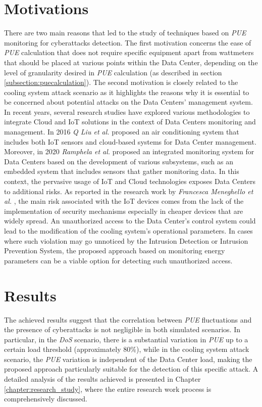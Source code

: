 \section{Motivations}
There are two main reasons that led to the study of techniques based on \emph{PUE} monitoring for cyberattacks detection. The first motivation concerns the ease of \emph{PUE} calculation that does not require specific equipment apart from wattmeters that should be placed at various points within the Data Center, depending on the level of granularity desired in \emph{PUE} calculation (as described in section \ref{subsection:puecalculation}). The second motivation is closely related to the cooling system attack scenario as it highlights the reasons why it is essential to be concerned about potential attacks on the Data Centers' management system. In recent years, several research studies have explored various methodologies to integrate Cloud and IoT solutions in the context of Data Centers monitoring and management. In 2016 \emph{Q Liu et al.} \cite{liu2016green} proposed an air conditioning system that includes both IoT sensors and cloud-based systems for Data Center management. Moreover, in 2020 \emph{Ramphela et al.} \cite{ramphela2020internet} proposed an integrated monitoring system for Data Centers based on the development of various subsystems, such as an embedded system that includes sensors that gather monitoring data. In this context, the pervasive usage of IoT and Cloud technologies exposes Data Centers to additional risks. As reported in the research work by \emph{Francesca Meneghello et al.} \cite{meneghello2019iot}, the main risk associated with the IoT devices comes from the lack of the implementation of security mechanisms especially in cheaper devices that are widely spread. An unauthorized access to the Data Center's control system could lead to the modification of the cooling system's operational parameters. In cases where such violation may go unnoticed by the Intrusion Detection or Intrusion Prevention System, the proposed approach based on monitoring energy parameters can be a viable option for detecting such unauthorized access.


\section{Results}
The achieved results suggest that the correlation between \emph{PUE} fluctuations and the presence of cyberattacks is not negligible in both simulated scenarios. In particular, in the \emph{DoS} scenario, there is a substantial variation in \emph{PUE} up to a certain load threshold (approximately 80\%), while in the cooling system attack scenario, the \emph{PUE} variation is independent of the Data Center load, making the proposed approach particularly suitable for the detection of this specific attack. A detailed analysis of the results achieved is presented in Chapter \ref{chapter:research_study}, where the entire research work process is comprehensively discussed.


